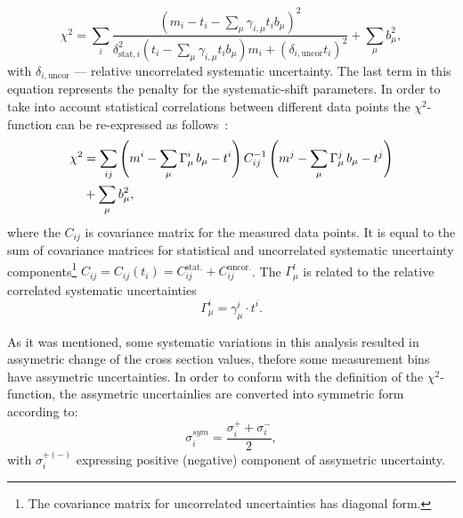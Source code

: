 \begin{equation}
 \chi^2 = \sum_i{ \frac{\left( m_i-t_i-\sum_{\mu}{\gamma_{i,\mu} t_i b_\mu} \right)^2 }{ \delta_{\text{stat},i}^2\left( t_i - \sum_\mu{\gamma_{i,\mu}t_ib_\mu} \right)m_i + \left( \delta_{i,\text{uncor}}t_i\right)^2 } } + \sum_{\mu}{b_\mu^2},
 \label{eq:chi2uncorr}
\end{equation}
with $\delta_{i,\text{uncor}}$ --- relative uncorrelated systematic uncertainty. The last term in this equation represents the penalty for the systematic-shift parameters. In order to take into account statistical correlations between different data points the $\chi^2$-function can be re-expressed as follows~\cite{Aaron:2009aa}:
\begin{align}
 \chi^2 &= \sum_{ij}{\left( m^i -\sum_{\mu}{\Gamma_\mu^i\,b_\mu - t^i }\right) C^{-1}_{ij} \left( m^j -\sum_{\mu}{\Gamma_\mu^j\,b_\mu - t^j }\right) }\notag\\
                                           &+ \sum_{\mu}{b_\mu^2},
 \label{eq:chi2corr}
\end{align}
where the $C_{ij}$ is covariance matrix for the measured data points. It is equal to the sum of covariance matrices for statistical and uncorrelated systematic uncertainty components\footnote{The covariance matrix for uncorrelated uncertainties has diagonal form.} $C_{ij}=C_{ij}\left(t_i\right)=C_{ij}^{\text{stat.}}+C_{ij}^{\text{uncor.}}$. The $\Gamma_\mu^l$ is related to the relative correlated systematic uncertainties
\begin{equation}
 \Gamma_{\mu}^i = \gamma_{\mu}^i \cdot t^i. 
\end{equation}

As it was mentioned, some systematic variations in this analysis resulted in assymetric change of the cross section values, thefore some measurement bins have assymetric uncertainties. In order to conform with the definition of the $\chi^2$-function, the assymetric uncertainlies are converted into symmetric form according to:
\begin{equation}
 \sigma_i^{sym} = \frac{\sigma_i^+ + \sigma_i^-}{2},
\end{equation}
with $\sigma_i^{+\left(-\right)}$ expressing positive (negative) component of assymetric uncertainty.

